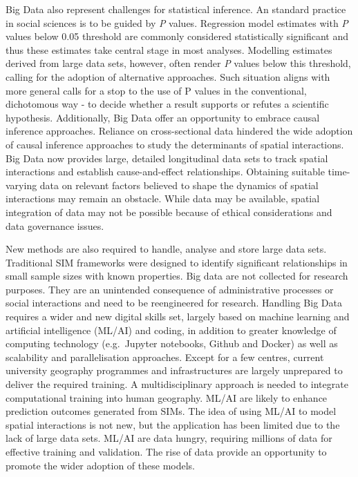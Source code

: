 \documentclass[11pt,letterpaper]{article}
\begin{document}
Big Data also represent challenges for statistical inference.
An standard practice in social sciences is to be guided by \emph{P} values.
Regression model estimates with \emph{P} values below 0.05 threshold are commonly considered statistically significant and thus these estimates take central stage in most analyses.
Modelling estimates derived from large data sets, however, often render \emph{P} values below this threshold, calling for the adoption of alternative approaches.
Such situation aligns with more general calls for a stop to the use of P values in the conventional, dichotomous way - to decide whether a result supports or refutes a scientific hypothesis.
Additionally, Big Data offer an opportunity to embrace causal inference approaches.
Reliance on cross-sectional data hindered the wide adoption of causal inference approaches to study the determinants of spatial interactions.
Big Data now provides large, detailed longitudinal data sets to track spatial interactions and establish cause-and-effect relationships.
Obtaining suitable time-varying data on relevant factors believed to shape the dynamics of spatial interactions may remain an obstacle.
While data may be available, spatial integration of data may not be possible because of ethical considerations and data governance issues.

New methods are also required to handle, analyse and store large data sets.
Traditional SIM frameworks were designed to identify significant relationships in small sample sizes with known properties.
Big data are not collected for research purposes.
They are an unintended consequence of administrative processes or social interactions and need to be reengineered for research.
Handling Big Data requires a wider and new digital skills set, largely based on machine learning and artificial intelligence (ML/AI) and coding, in addition to greater knowledge of computing technology (e.g.~Jupyter notebooks, Github and Docker) as well as scalability and parallelisation approaches.
Except for a few centres, current university geography programmes and infrastructures are largely unprepared to deliver the required training.
A multidisciplinary approach is needed to integrate computational training into human geography.
ML/AI are likely to enhance prediction outcomes generated from SIMs.
The idea of using ML/AI to model spatial interactions is not new, but the application has been limited due to the lack of large data sets.
ML/AI are data hungry, requiring millions of data for effective training and validation.
The rise of data provide an opportunity to promote the wider adoption of these models.
\end{document}
